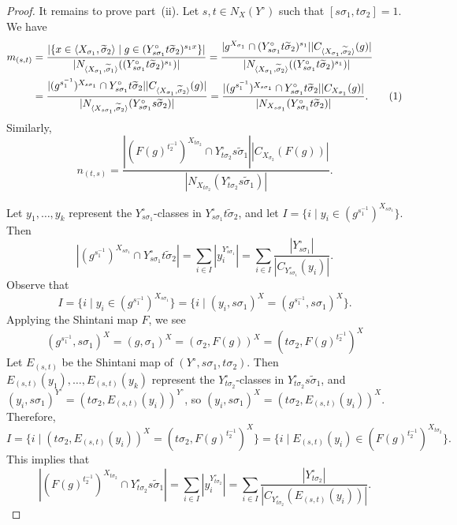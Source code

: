 \documentclass[11pt]{article}
\numberwithin{equation}{section}
\theoremstyle{shdefinition}
\theoremstyle{shplain}
\newcommand{\s}{\sigma}
\newcommand{\ws}{\widetilde{\sigma}}
\newcommand{\<}{\langle}
\renewcommand{\>}{\rangle}
\renewcommand{\:}{\colon}
\begin{document}
\begin{proof}
It remains to prove part~(ii). Let $s,t \in N_X(Y^\circ)$ such that $[s\s_1,t\s_2]=1$. We have
\begin{align*}
m_{(s,t)} &= \frac{|\{ x \in \< X_{\s_1},\ws_2 \> \mid g \in (Y^\circ_{s\s_1}t\ws_2)^{s_1 x} \}|}{|N_{\<X_{\s_1},\ws_1\>}((Y^\circ_{s\s_1}t\ws_2)^{s_1})|}  
           = \frac{|g^{X_{\s_1}} \cap  (Y^\circ_{s\s_1}t\ws_2)^{s_1}||C_{\<X_{\s_1},\ws_2\>}(g)|}{|N_{\<X_{\s_1},\ws_2\>}((Y^\circ_{s\s_1}t\ws_2)^{s_1})|} \\
          &= \frac{|(g^{s_1^{-1}})^{X_{s\s_1}} \cap    Y^\circ_{s\s_1}t\ws_2||C_{\<X_{\s_1},\ws_2\>}(g)|}{|N_{\<X_{s\s_1},\ws_2\>}(Y^\circ_{s\s_1}s\ws_2)|}
           = \frac{|(g^{s_1^{-1}})^{X_{s\s_1}} \cap  Y^\circ_{s\s_1}t\ws_2||C_{X_{\s_1}}(g)|}{|N_{X_{s\s_1}}(Y^\circ_{s\s_1}t\ws_2)|}.
          \stepcounter{equation}\tag{\theequation}\label{eq:m}
\end{align*}
Similarly,
\begin{equation}
n_{(t,s)} = \frac{|(F(g)^{t_2^{-1}})^{X_{t\s_2}} \cap  Y^\circ_{t\s_2}s\ws_1||C_{X_{\s_2}}(F(g))|}{|N_{X_{t\s_2}}(Y^\circ_{t\s_2}s\ws_1)|}. \label{eq:n}
\end{equation}

Let $y_1,\dots,y_k$ represent the $Y^\circ_{s\s_1}$-classes in $Y^\circ_{s\s_1} t\ws_2$, and let $I = \{ i \mid y_i \in (g^{s_1^{-1}})^{X_{s\s_1}} \}$. Then
\begin{equation}
|(g^{s_1^{-1}})^{X_{s\s_1}} \cap  Y^\circ_{s\s_1}t\ws_2| = \sum_{i \in I} |y_i^{Y^\circ_{s\s_1}}| = \sum_{i \in I} \frac{|Y^\circ_{s\s_1}|}{|C_{Y^\circ_{s\s_1}}(y_i)|}. \label{eq:m_frac}
\end{equation}
Observe that
\[
I = \{ i \mid y_i \in (g^{s_1^{-1}})^{X_{s\s_1}} \}
  = \{ i \mid (y_i,s\s_1)^X = (g^{s_1^{-1}}\!\!\!,s\s_1)^X \}.
\]
Applying the Shintani map $F$, we see
\[
(g^{s_1^{-1}}\!\!\!,s\s_1)^X = (g,\s_1)^X = (\s_2,F(g))^X = (t\s_2,F(g)^{t_2^{-1}})^X
\]
Let $E_{(s,t)}$ be the Shintani map of $(Y^\circ,s\s_1,t\s_2)$. Then $E_{(s,t)}(y_1), \dots, E_{(s,t)}(y_k)$ represent the $Y^\circ_{t\s_2}$-classes in $Y^\circ_{t\s_2} s\ws_1$, and  $(y_i,s\s_1)^{Y^\circ} = (t\s_2,E_{(s,t)}(y_i))^{Y^\circ}$, so $(y_i,s\s_1)^X = (t\s_2,E_{(s,t)}(y_i))^X$. Therefore,
\[
I = \{ i \mid (t\s_2,E_{(s,t)}(y_i))^X = (t\s_2,F(g)^{t_2^{-1}})^X \}
  = \{ i \mid E_{(s,t)}(y_i) \in (F(g)^{t_2^{-1}})^{X_{t\s_2}} \}.
\]
This implies that
\begin{equation} \label{eq:n_frac}
|(F(g)^{t_2^{-1}})^{X_{t\s_2}} \cap  Y^\circ_{t\s_2}s\ws_1| = \sum_{i \in I} |y_i^{Y^\circ_{t\s_2}}| = \sum_{i \in I} \frac{|Y^\circ_{t\s_2}|}{|C_{Y^\circ_{t\s_2}}(E_{(s,t)}(y_i))|}.
\end{equation}


\end{proof}
\end{document}
